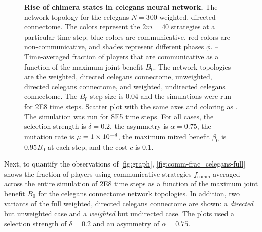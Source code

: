 \documentclass[pdflatex,lineno,referee,sn-nature]{sn-jnl}
\begin{document}
\begin{figure}
  \centering
  \begin{subcaptiongroup}
      {\label{fig:time-series_celegans-full}\captiontext*{}}{%
      {\label{fig:comm-frac_celegans-undirected}\captiontext*{}}{%
      {\label{fig:comm-frac_celegans-unweighted}\captiontext*{}}{%
      {\label{fig:comm-frac_celegans-full}\captiontext*{}}{%
      {\label{fig:graph}\captiontext*{}}{%
    {}%
  }}}}}
  \end{subcaptiongroup}
  \caption{
    \textbf{
      Rise of chimera states in \gls{celegans} neural network.
    }
    The network topology for the \gls{celegans}
    $N=300$ weighted, directed connectome.
    The colors represent the $2m = 40$ strategies
    at a particular time step;
    blue colors are communicative,
    red colors are non-communicative,
    and shades represent different phases $\phi$.
    --
    Time-averaged fraction of players that are communicative as a function
    of the maximum joint benefit $B_0$.
    The network topologies are the
    weighted, directed \gls{celegans} connectome,
    unweighted, directed \gls{celegans} connectome,
    and
    weighted, undirected \gls{celegans} connectome.
    The $B_0$ step size is \num{0.04} and
    the simulations were run for \num{2E8} time steps.
    Scatter plot with the same axes and coloring
    as .
    The simulation was run for \num{8E5} time steps.
    For all cases,
    the selection strength is $\delta=0.2$,
    the asymmetry is $\alpha=0.75$,
    the mutation rate is $\mu=\num{1E-4}$,
    the maximum mixed benefit $\beta_0$ is $\num{0.95} B_0$ at each step,
    and
    the cost $c$ is \num{0.1}.
  }
  \label{fig:c-elegans}
\end{figure}

Next, to quantify the observations of \cref{fig:graph},
\cref{fig:comm-frac_celegans-full} shows the fraction of players
using communicative strategies $f_{\text{comm}}$ averaged across
the entire simulation of \num{2E8} time steps as a function
of the maximum joint benefit $B_0$
for the \gls{celegans} connectome network topologies.
In addition, two variants of the full weighted, directed \gls{celegans}
connectome are shown:
a  \emph{directed} but unweighted case
and
a  \emph{weighted} but undirected case.
The plots used a selection strength of $\delta=0.2$
and an asymmetry of $\alpha=0.75$.
\end{document}
